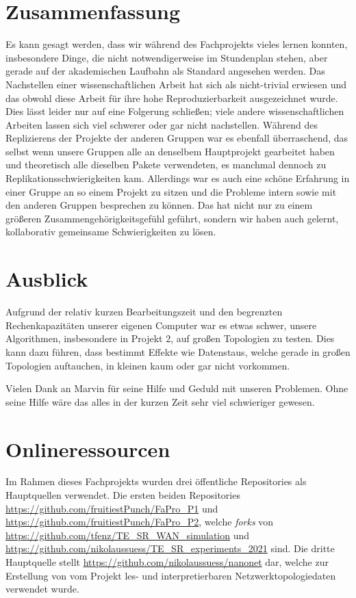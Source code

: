 \documentclass[sigconf, nonacm, review]{acmart}
\begin{document}
\section{Zusammenfassung}
Es kann gesagt werden, dass wir w\"ahrend des Fachprojekts vieles lernen konnten, 
insbesondere Dinge, die nicht notwendigerweise im Stundenplan stehen, 
aber gerade auf der akademischen Laufbahn als Standard angesehen werden.
Das Nachstellen einer wissenschaftlichen Arbeit hat sich als nicht-trivial erwiesen 
und das obwohl diese Arbeit f\"ur ihre hohe Reproduzierbarkeit ausgezeichnet wurde.
Dies l\"asst leider nur auf eine Folgerung schlie\ss en; viele andere wissenschaftlichen Arbeiten lassen sich viel schwerer oder gar nicht nachstellen. 
W\"ahrend des Replizierens der Projekte der anderen Gruppen war es ebenfall \"uberraschend, 
das selbst wenn unsere Gruppen alle an denselbem Hauptprojekt gearbeitet haben 
und theoretisch alle dieselben Pakete verwendeten, 
es manchmal dennoch zu Replikationsschwierigkeiten kam.
Allerdings war es auch eine sch\"one Erfahrung in einer Gruppe an so einem Projekt zu sitzen 
und die Probleme intern sowie mit den anderen Gruppen besprechen zu k\"onnen.
Das hat nicht nur zu einem gr\"o\ss eren Zusammengeh\"origkeitsgef\"uhl gef\"uhrt,
sondern wir haben auch gelernt, kollaborativ gemeinsame Schwierigkeiten zu l\"osen. 
\section{Ausblick}
Aufgrund der relativ kurzen Bearbeitungszeit und den begrenzten Rechenkapazit\"aten unserer eigenen Computer war es etwas schwer, unsere Algorithmen, insbesondere in Projekt 2, auf gro\ss en Topologien zu testen.
Dies kann dazu f\"uhren, dass bestimmt Effekte wie Datenstaus, welche gerade in gro\ss en Topologien auftauchen, in kleinen kaum oder gar nicht vorkommen.

\begin{acks}
Vielen Dank an Marvin f\"ur seine Hilfe und Geduld mit unseren Problemen. Ohne seine Hilfe w\"are das alles in der kurzen Zeit sehr viel schwieriger gewesen.
\end{acks}




\appendix
\section{Onlineressourcen}
\label{sec:resouces}
Im Rahmen dieses Fachprojekts wurden drei \"offentliche Repositories als Hauptquellen verwendet. Die ersten beiden Repositories \url{https://github.com/fruitiestPunch/FaPro_P1} und \url{https://github.com/fruitiestPunch/FaPro_P2}, welche \emph{forks} von \url{https://github.com/tfenz/TE_SR_WAN_simulation} und \url{https://github.com/nikolaussuess/TE_SR_experiments_2021} sind. Die dritte Hauptquelle stellt \url{https://github.com/nikolaussuess/nanonet} dar, welche zur Erstellung von vom Projekt les- und interpretierbaren Netzwerktopologiedaten verwendet wurde.
\end{document}

